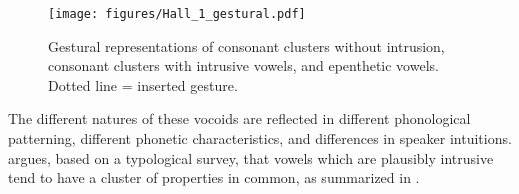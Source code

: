 \documentclass[output=paper,colorlinks,citecolor=brown]{langscibook}
\begin{document}
  
\begin{figure}
\caption{Gestural representations of consonant clusters without intrusion, consonant clusters with intrusive vowels, and epenthetic vowels. Dotted line = inserted gesture.}
\texttt{[image: figures/Hall\_1\_gestural.pdf]}
\label{1ges}
\end{figure}


The different natures of these vocoids are reflected in different phonological patterning, different phonetic characteristics, and differences in speaker intuitions. \citet{Hall:2003, Hall2006} argues, based on a typological survey, that vowels which are plausibly intrusive tend to have a cluster of properties in common, as summarized in . 
\end{document}
